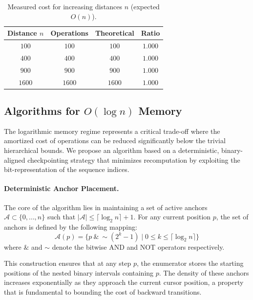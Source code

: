\documentclass[a4paper,10pt]{article}
\begin{document}
\begin{table}[H]
\centering
\caption{Measured cost for increasing distances $n$ (expected $O(n)$).}
\label{tab:linear-scaling}
\medskip
\begin{tabular}{c|c|c|c}
\toprule
Distance $n$ & Operations& Theoretical & Ratio \\
\midrule
$100$  & $100$  & $100$  & $1.000$ \\
$400$  & $400$  & $400$  & $1.000$ \\
$900$  & $900$  & $900$  & $1.000$ \\
$1600$ & $1600$ & $1600$ & $1.000$ \\
\bottomrule
\end{tabular}
\end{table}

\subsection{Algorithms for \(O(\log n)\) Memory}

The logarithmic memory regime represents a critical trade-off where the amortized cost of operations can be reduced significantly below the trivial hierarchical bounds. We propose an algorithm based on a deterministic, binary-aligned checkpointing strategy that minimizes recomputation by exploiting the bit-representation of the sequence indices.

\paragraph{Deterministic Anchor Placement.}
The core of the algorithm lies in maintaining a set of active anchors \(\mathcal{A} \subset \{0, \dots, n\}\) such that \(|\mathcal{A}| \le \lceil \log_2 n \rceil + 1\). For any current position \(p\), the set of anchors is defined by the following mapping:
\[
\mathcal{A}(p) = \{ p \ \& \ \sim(2^k - 1) \mid 0 \le k \le \lceil \log_2 n \rceil \}
\]
where \(\&\) and \(\sim\) denote the bitwise AND and NOT operators respectively. 

This construction ensures that at any step \(p\), the enumerator stores the starting positions of the nested binary intervals containing \(p\). The density of these anchors increases exponentially as they approach the current cursor position, a property that is fundamental to bounding the cost of backward transitions.
\end{document}
